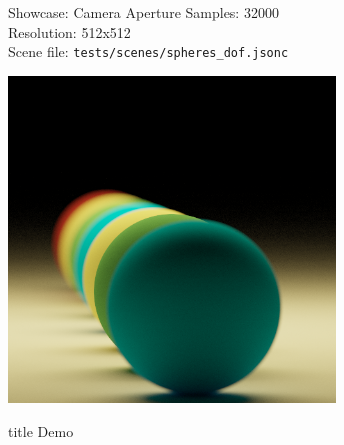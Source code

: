 \documentclass{beamer}
\begin{document}
\begin{frame}{Showcase: Camera Aperture}
    \footnotesize{
    Samples: 32000\\
    Resolution: 512x512\\
    Scene file: \texttt{tests/scenes/spheres\_dof.jsonc}
    }
    \begin{center}
        \includegraphics[width=0.65\textwidth]{../img/dof.png}
    \end{center}
\end{frame}

\begin{frame}
    \vfill
    \centering
    \begin{beamercolorbox}[sep=8pt,center,shadow=true,rounded=true]{title}
        Demo\par
    \end{beamercolorbox}
    \vfill
\end{frame}
\end{document}

